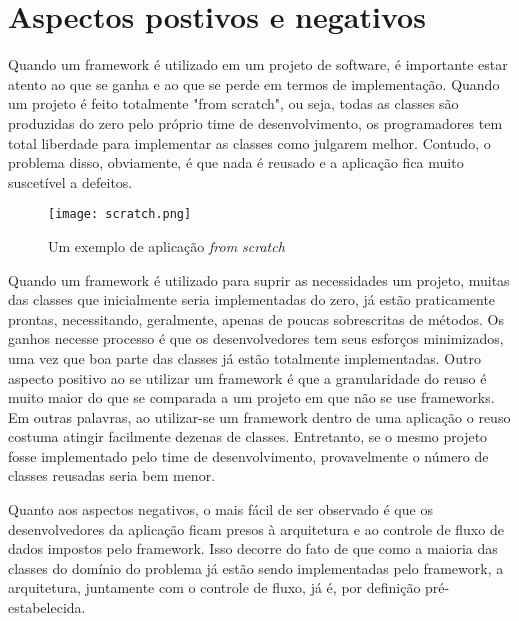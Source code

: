 \documentclass[
    12pt,       %
    openright,      %
    twoside,      %
    a4paper,      %
    english,      %
    french,       %
    spanish,      %
    brazil,       %
    ]{abntex2}
\begin{document}
      \section{Aspectos postivos e negativos}
          Quando um framework é utilizado em um projeto de software, é importante estar
          atento ao que se ganha e ao que se perde em termos de implementação. Quando
          um projeto é feito totalmente "from scratch", ou seja, todas as classes são
          produzidas do zero pelo próprio time de desenvolvimento, os programadores tem
          total liberdade para implementar as classes como julgarem melhor. Contudo, o
          problema disso, obviamente, é que nada é reusado e a aplicação fica muito
          suscetível a defeitos.

          \begin{figure}[htbp]
              \begin{center}
                  \texttt{[image: scratch.png]}
              \end{center}
              \caption{\label{fig:passaro}Um exemplo de aplicação \textit{from scratch}}
          \end{figure}

          Quando um framework é utilizado para suprir as necessidades um projeto, muitas
          das classes que inicialmente seria implementadas do zero, já estão praticamente
          prontas, necessitando, geralmente, apenas de poucas sobrescritas de métodos.
          Os ganhos necesse processo é que os desenvolvedores tem seus esforços
          minimizados, uma vez que boa parte das classes já estão totalmente implementadas.
          Outro aspecto positivo ao se utilizar um framework é que a granularidade do
          reuso é muito maior do que se comparada a um projeto em que não se use frameworks.
          Em outras palavras, ao utilizar-se um framework dentro de uma aplicação o reuso
          costuma atingir facilmente dezenas de classes. Entretanto, se o mesmo projeto
          fosse implementado pelo time de desenvolvimento, provavelmente o número de
          classes reusadas seria bem menor.

          Quanto aos aspectos negativos, o mais fácil de ser observado é que os
          desenvolvedores da aplicação ficam presos à arquitetura e ao controle
          de fluxo de dados impostos pelo framework. Isso decorre do fato de que como a
          maioria das classes do domínio do problema já estão sendo implementadas pelo
          framework, a arquitetura, juntamente com o controle de fluxo, já é, por
          definição pré-estabelecida.
\end{document}
